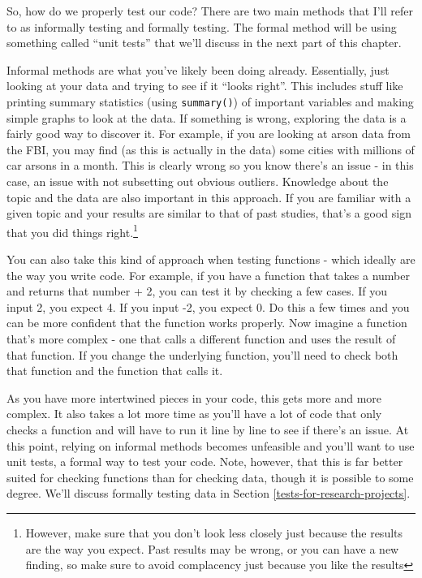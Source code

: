 \documentclass[
]{krantz}
\begin{document}
So, how do we properly test our code? There are two main
methods that I'll refer to as informally testing and
formally testing. The formal method will be using something
called ``unit tests'' that we'll discuss in the next part of
this chapter.

Informal methods are what you've likely been doing already.
Essentially, just looking at your data and trying to see if
it ``looks right''. This includes stuff like printing
summary statistics (using \texttt{summary()}) of important
variables and making simple graphs to look at the data. If
something is wrong, exploring the data is a fairly good way
to discover it. For example, if you are looking at arson
data from the FBI, you may find (as this is actually in the
data) some cities with millions of car arsons in a month.
This is clearly wrong so you know there's an issue - in this
case, an issue with not subsetting out obvious outliers.
Knowledge about the topic and the data are also important in
this approach. If you are familiar with a given topic and
your results are similar to that of past studies, that's a
good sign that you did things right.\footnote{However, make
  sure that you don't look less closely just because the
  results are the way you expect. Past results may be wrong,
  or you can have a new finding, so make sure to avoid
  complacency just because you like the results}

You can also take this kind of approach when testing
functions - which ideally are the way you write code. For
example, if you have a function that takes a number and
returns that number + 2, you can test it by checking a few
cases. If you input 2, you expect 4. If you input -2, you
expect 0. Do this a few times and you can be more confident
that the function works properly. Now imagine a function
that's more complex - one that calls a different function
and uses the result of that function. If you change the
underlying function, you'll need to check both that function
and the function that calls it.

As you have more intertwined pieces in your code, this gets
more and more complex. It also takes a lot more time as
you'll have a lot of code that only checks a function and
will have to run it line by line to see if there's an issue.
At this point, relying on informal methods becomes
unfeasible and you'll want to use unit tests, a formal way
to test your code. Note, however, that this is far better
suited for checking functions than for checking data, though
it is possible to some degree. We'll discuss formally
testing data in Section \ref{tests-for-research-projects}.
\end{document}
